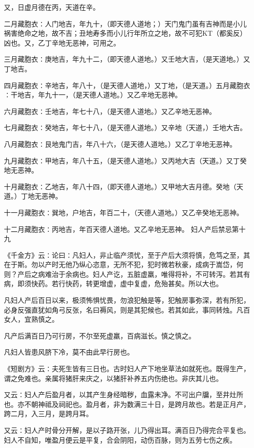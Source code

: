 \documentclass[a4paper,12pt,UTF8,twoside]{ctexbook}
\begin{document}
又，日虚月德在丙，天道在辛。

二月藏胞衣∶人门地吉，年九十，（即天德人道地；）天门鬼门虽有吉神而是小儿祸害绝命之地，故不吉；丑地寿多而小儿行年所立之地，故不可犯KT（都奚反）凶也。又，乙丁辛地无恶神，可用之。

三月藏胞衣∶庚地吉，年九十二，（即天德人道地。）又壬地大吉，（是天道地。）又丁地吉。

四月藏胞衣∶辛地吉，年八十，（是天德人道地，）又丁地，（是天道。）五月藏胞衣∶干地吉，年九十一，（是天德人道地。）又乙辛地无恶神。

六月藏胞衣∶壬地吉，年七十八，（是天德人道地。）又乙辛地无恶神。

七月藏胞衣∶癸地吉，年七十八，（是天德人道地。）又辛地（天道，）壬地大吉。

八月藏胞衣∶艮地鬼门吉，年八十六，（是天德人道地。）又乙丁辛地无恶神。

九月藏胞衣∶甲地吉，年八十五，（是天德人道地。）又丙地大吉（天道。）又丁癸地无恶神。

十月藏胞衣∶乙地吉，年八十四，（即天德人道地。）又甲地大吉月德。癸地（天道。）丁地无恶神。

十一月藏胞衣∶巽地，户地吉，年百二十，（天德人道地。）又乙辛癸地无恶神。

十二月藏胞衣∶丙地吉，年百天德人道地。又乙辛地无恶神。
妇人产后禁忌第十九

《千金方》云∶论曰∶凡妇人，非止临产须忧，至于产后大须将慎，危笃之至，其在于斯。勿以产时无他乃纵心恣意，无所不犯，犯时微若秋豪，成病于嵩岱，何则？产后之病难治于余病也。妇人产讫，五脏虚羸，唯得将补，不可转泻。若其有病，即须快药。若行快药，转更增虚，虚中复虚，危殆甚矣。所以大也。

凡妇人产后百日以来，极须怖惧忧畏，勿浪犯触是等，犯触房事弥深，若有所犯，必身反强直犹如角弓反张，名曰褥风，则是其犯候也。若其如此，事同转烛。凡百女人，宜熟慎之。

凡产后满百日乃可行房，不尔至死虚羸，百病滋长。慎之慎之。

凡妇人皆患风脐下冷，莫不由此早行房也。

《短剧方》云∶夫死生皆有三日也。古时妇人产下地坐草法如就死也。既得生产，谓之免难也。亲属将猪肝来庆之，以猪肝补养五内伤绝也。非庆其儿也。

又云∶妇人产后盈月者，以其产生身经暗秽，血露未净。不可出户牖，至井灶所也。亦不朝神祗及祠祀也。盈月者，非为数满三十日，是跨月故也。若是正月产，跨二月，入三月，是跨月耳。

又云∶妇人产时骨分开解，是以子路开张，儿乃得出耳。满百日乃得完合平复也。妇人不自知，唯盈月便云是平复，合会阴阳，动伤百脉，则为五劳七伤之疾。
\end{document}
